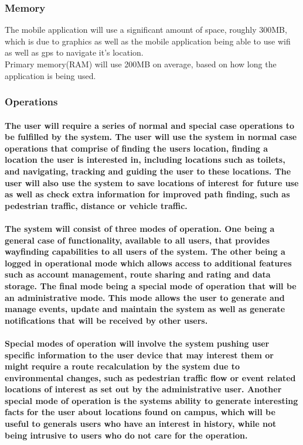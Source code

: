 \documentclass{article}
\begin{document}
            \subsubsection{Memory}
	    {The mobile application will use a significant amount of space, roughly 300MB, which is due to graphics as well as the mobile application being able to use wifi as well as gps to navigate it's location.\\
Primary memory(RAM) will use 200MB on average, based on how long the application is being used.}
            \subsubsection{Operations}
            	\paragraph{The user will require a series of normal and special case operations to be fulfilled by the system. The user will use the system in normal case operations that comprise of finding the users location, finding a location the user is interested in, including locations such as toilets, and navigating, tracking and guiding the user to these locations. The user will also use the system to save locations of interest for future use as well as check extra information for improved path finding, such as pedestrian traffic, distance or vehicle traffic.\\\\
            	The system will consist of three modes of operation. One  being a general case of functionality, available to all users, that provides wayfinding capabilities to all users of the system. The other being a logged in operational mode which allows access to additional features such as account management, route sharing and rating and data storage. The final mode being a special mode of operation that will be an administrative mode. This mode allows the user to generate and manage events, update and maintain the system as well as generate notifications that will be received by other users.\\\\
            	Special modes of operation will involve the system pushing user specific information to the user device that may interest them or might require a route recalculation by the system due to environmental changes, such as pedestrian traffic flow or event related locations of interest as set out by the administrative user. Another special mode of operation is the systems ability to generate interesting facts for the user about locations found on campus, which will be useful to generals users who have an interest in history, while not being intrusive to users who do not care for the operation.\\\\
}
\end{document}
